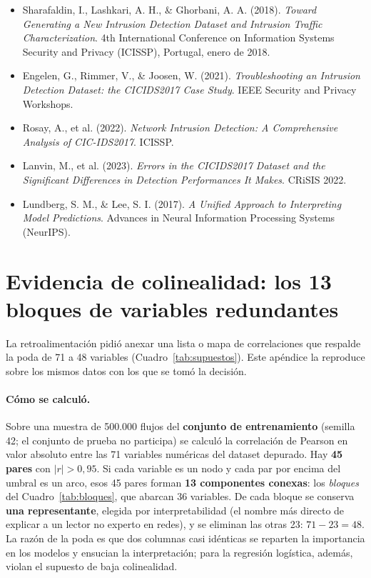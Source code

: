 \documentclass[11pt,a4paper]{article}
\begin{document}
\begin{itemize}[leftmargin=*, label={}]
\item Sharafaldin, I., Lashkari, A. H., \& Ghorbani, A. A. (2018).
\emph{Toward Generating a New Intrusion Detection Dataset and Intrusion
Traffic Characterization}. 4th International Conference on Information
Systems Security and Privacy (ICISSP), Portugal, enero de 2018.
\item Engelen, G., Rimmer, V., \& Joosen, W. (2021). \emph{Troubleshooting an
Intrusion Detection Dataset: the CICIDS2017 Case Study}. IEEE Security and
Privacy Workshops.
\item Rosay, A., et al. (2022). \emph{Network Intrusion Detection: A
Comprehensive Analysis of CIC-IDS2017}. ICISSP.
\item Lanvin, M., et al. (2023). \emph{Errors in the CICIDS2017 Dataset and
the Significant Differences in Detection Performances It Makes}. CRiSIS 2022.
\item Lundberg, S. M., \& Lee, S. I. (2017). \emph{A Unified Approach to
Interpreting Model Predictions}. Advances in Neural Information Processing
Systems (NeurIPS).
\end{itemize}

\clearpage
\appendix
\renewcommand{\thetable}{\Alph{section}.\arabic{table}}
\renewcommand{\thefigure}{\Alph{section}.\arabic{figure}}
\setcounter{table}{0}\setcounter{figure}{0}
\section{Evidencia de colinealidad: los 13 bloques de variables redundantes}
\label{ap:colinealidad}

La retroalimentación pidió anexar una lista o mapa de correlaciones que
respalde la poda de 71 a 48 variables (Cuadro~\ref{tab:supuestos}). Este
apéndice la reproduce sobre los mismos datos con los que se tomó la decisión.

\paragraph{Cómo se calculó.} Sobre una muestra de 500.000 flujos del
\textbf{conjunto de entrenamiento} (semilla 42; el conjunto de prueba no
participa) se calculó la correlación de Pearson en valor absoluto entre las 71
variables numéricas del dataset depurado. Hay \textbf{45 pares} con
$|r| > 0{,}95$. Si cada variable es un nodo y cada par por encima del umbral
es un arco, esos 45 pares forman \textbf{13 componentes conexas}: los
\emph{bloques} del Cuadro~\ref{tab:bloques}, que abarcan 36 variables. De
cada bloque se conserva \textbf{una representante}, elegida por
interpretabilidad (el nombre más directo de explicar a un lector no experto
en redes), y se eliminan las otras 23: $71 - 23 = 48$. La razón de la poda es
que dos columnas casi idénticas se reparten la importancia en los modelos y
ensucian la interpretación; para la regresión logística, además, violan el
supuesto de baja colinealidad.
\end{document}

